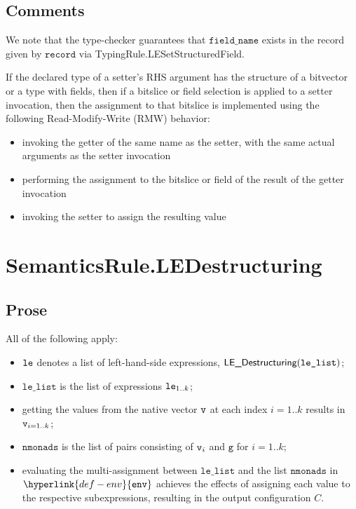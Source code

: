 \documentclass{book}
\newcommand\env[0]{\hyperlink{def-env}{\texttt{env}}}
\newcommand\vg[0]{\texttt{g}}
\newcommand\fieldname[0]{\texttt{field\_name}}
\newcommand\record[0]{\texttt{record}}
\newcommand\vlelist[0]{\texttt{le\_list}}
\newcommand\nmonads[0]{\texttt{nmonads}}
\begin{document}
\subsection{Comments}
We note that the type-checker guarantees that $\fieldname$ exists in the record given by $\record$
via TypingRule.LESetStructuredField.

If the declared type of a setter’s RHS argument has the structure of a
bitvector or a type with fields, then if a bitslice or field selection is
applied to a setter invocation, then the assignment to that bitslice is
implemented using the following Read-Modify-Write (RMW) behavior:
\begin{itemize}
\item invoking the getter of the same name as the setter, with the same actual
arguments as the setter invocation
\item performing the assignment to the bitslice or field of the result of the
getter invocation
\item invoking the setter to assign the resulting value
\end{itemize}

\section{SemanticsRule.LEDestructuring \label{sec:SemanticsRule.LEDestructuring}}
    \subsection{Prose}
    All of the following apply:
    \begin{itemize}
    \item $\texttt{le}$ denotes a list of left-hand-side expressions, $\LEDestructuring(\vlelist)$;
    \item $\vlelist$ is the list of expressions $\texttt{le}_{1..k}$;
    \item getting the values from the native vector $\texttt{v}$ at each index $i=1..k$
    results in $\texttt{v}_{i=1..k}$;
    \item $\nmonads$ is the list of pairs consisting of $\texttt{v}_i$ and $\vg$ for $i=1..k$;
    \item evaluating the multi-assignment between $\vlelist$ and the list $\nmonads$
    in $\env$ achieves the effects of assigning each value to the respective
    subexpressions, resulting in the output configuration $C$.
    \end{itemize}
\end{document}
